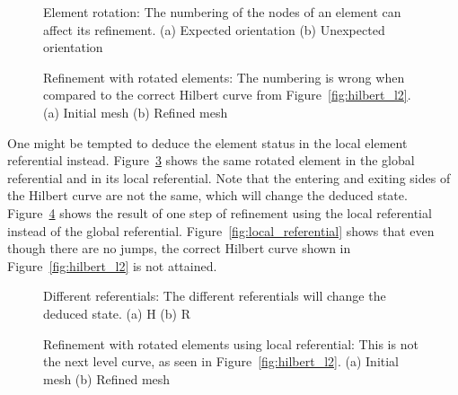 \begin{figure}[H]
    \centering
    \hfill
    \caption{Element rotation: The numbering of the nodes of an element can affect its refinement. (a) Expected orientation (b) Unexpected orientation}\label{fig:node_order}
\end{figure}

\begin{figure}[H]
    \centering
    \hfill
    \caption{Refinement with rotated elements: The numbering is wrong when compared to the correct Hilbert curve from Figure~\ref{fig:hilbert_l2}. (a) Initial mesh (b) Refined mesh}\label{fig:hilbert_rotated}
\end{figure}

One might be tempted to deduce the element status in the local element referential instead.
Figure~\ref{fig:referentials} shows the same rotated element in the global referential and in its
local referential. Note that the entering and exiting sides of the Hilbert curve are not the same,
which will change the deduced state. Figure~\ref{fig:hilbert_local} shows the result of one step of
refinement using the local referential instead of the global referential.
Figure~\ref{fig:local_referential} shows that even though there are no jumps, the correct Hilbert
curve shown in Figure~\ref{fig:hilbert_l2} is not attained.

\begin{figure}[H]
    \centering
    \hfill
    \caption{Different referentials: The different referentials will change the deduced state. (a) H (b) R}\label{fig:referentials}
\end{figure}

\begin{figure}[H]
    \centering
    \hfill
    \caption{Refinement with rotated elements using local referential: This is not the next level curve, as seen in Figure~\ref{fig:hilbert_l2}. (a) Initial mesh (b) Refined mesh}\label{fig:hilbert_local}
\end{figure}

